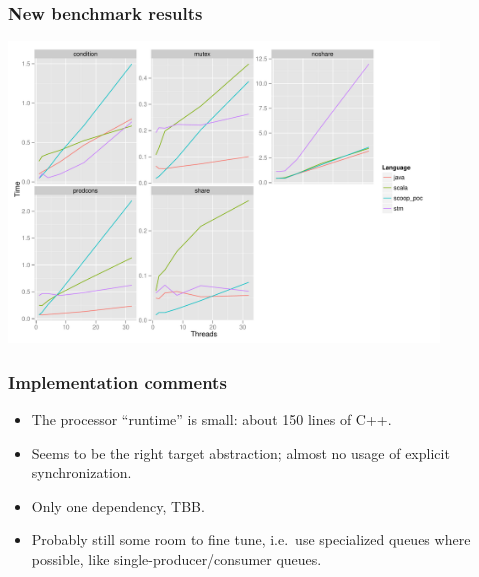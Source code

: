 \documentclass{beamer}
\begin{document}
\begin{frame}
  \frametitle{New benchmark results}
  \begin{center}
    \includegraphics[width=4.5in]{time-facet-new}
  \end{center}
\end{frame}

\begin{frame}
  \frametitle{Implementation comments}

  \begin{itemize}
  \item The processor ``runtime'' is small: about 150 lines of C++.
  \item Seems to be the right target abstraction; almost no usage of
    explicit synchronization.
  \item Only one dependency, TBB.
  \item Probably still some room to fine tune, 
    i.e.\ use specialized queues where possible, like single-producer/consumer queues.
  \end{itemize}
\end{frame}



\end{document}

